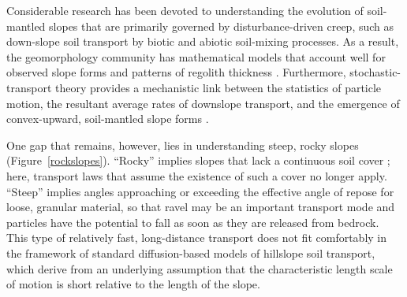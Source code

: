 \documentclass[esurf, manuscript]{copernicus}
\begin{document}
Considerable research has been devoted to understanding the evolution of soil-mantled slopes that are primarily governed by disturbance-driven creep, such as down-slope soil transport by biotic and abiotic soil-mixing processes. As a result, the geomorphology community has mathematical models that account well for observed slope forms and patterns of regolith thickness \citep[e.g.,][]{roering2008well}. Furthermore, stochastic-transport theory provides a mechanistic link between the statistics of particle motion, the resultant average rates of downslope transport, and the emergence of convex-upward, soil-mantled slope forms \citep{culling1963soil,roering2004soil,foufoula2010nonlocal,furbish2009statistical,furbish2010divots,tucker2010trouble}.

One gap that remains, however, lies in understanding steep, rocky slopes (Figure~\ref{rockslopes}). ``Rocky'' implies slopes that lack a continuous soil cover \citep{howard1994rock}; here, transport laws that assume the existence of such a cover no longer apply. ``Steep'' implies angles approaching or exceeding the effective angle of repose for loose, granular material, so that ravel may be an important transport mode %
\citep[e.g.,][]{gabet2003sediment,roering2005fire,lamb2011model,gabet2012particle} and particles have the potential to fall as soon as they are released from bedrock. This type of relatively fast, long-distance transport does not fit comfortably in the framework of standard diffusion-based models of hillslope soil transport, which derive from an underlying assumption that the characteristic length scale of motion is short relative to the length of the slope.
\end{document}
